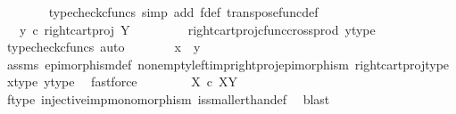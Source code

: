 \begin{isabellebody}
\ \ \ \ \ \ \isamarkupfalse%
\ {\isacharparenleft}{\kern0pt}typecheck{\isacharunderscore}{\kern0pt}cfuncs{\isacharcomma}{\kern0pt}\ simp\ add{\isacharcolon}{\kern0pt}\ f{\isacharunderscore}{\kern0pt}def\ transpose{\isacharunderscore}{\kern0pt}func{\isacharunderscore}{\kern0pt}def{\isacharparenright}{\kern0pt}\isanewline
\ \ \ \ \isamarkupfalse%
\ \isamarkupfalse%
\ {\isachardoublequoteopen}{\isachardot}{\kern0pt}{\isachardot}{\kern0pt}{\isachardot}{\kern0pt}\ {\isacharequal}{\kern0pt}\ y\ {\isasymcirc}\isactrlsub c\ {\isacharparenleft}{\kern0pt}right{\isacharunderscore}{\kern0pt}cart{\isacharunderscore}{\kern0pt}proj\ Y\ {\isasymone}{\isacharparenright}{\kern0pt}{\isachardoublequoteclose}\isanewline
\ \ \ \ \ \ \isamarkupfalse%
\ right{\isacharunderscore}{\kern0pt}cart{\isacharunderscore}{\kern0pt}proj{\isacharunderscore}{\kern0pt}cfunc{\isacharunderscore}{\kern0pt}cross{\isacharunderscore}{\kern0pt}prod\ y{\isacharunderscore}{\kern0pt}type{}\ \isamarkupfalse%
\ {\isacharparenleft}{\kern0pt}typecheck{\isacharunderscore}{\kern0pt}cfuncs{\isacharcomma}{\kern0pt}\ auto{\isacharparenright}{\kern0pt}\isanewline
\ \ \ \ \isamarkupfalse%
\ \isamarkupfalse%
\ {\isachardoublequoteopen}x\ {\isacharequal}{\kern0pt}\ y{\isachardoublequoteclose}\isanewline
\ \ \ \ \ \ \isamarkupfalse%
\ assms\ epimorphism{\isacharunderscore}{\kern0pt}def{}\ nonempty{\isacharunderscore}{\kern0pt}left{\isacharunderscore}{\kern0pt}imp{\isacharunderscore}{\kern0pt}right{\isacharunderscore}{\kern0pt}proj{\isacharunderscore}{\kern0pt}epimorphism\ right{\isacharunderscore}{\kern0pt}cart{\isacharunderscore}{\kern0pt}proj{\isacharunderscore}{\kern0pt}type\ x{\isacharunderscore}{\kern0pt}type{}\ y{\isacharunderscore}{\kern0pt}type{}\ \isamarkupfalse%
\ fastforce\isanewline
\ \ \isamarkupfalse%
\isanewline
\ \ \isamarkupfalse%
\ \isamarkupfalse%
\ {\isachardoublequoteopen}X\ {\isasymle}\isactrlsub c\ X\isactrlbsup Y\isactrlesup {\isachardoublequoteclose}\isanewline
\ \ \ \ \isamarkupfalse%
\ f{\isacharunderscore}{\kern0pt}type\ injective{\isacharunderscore}{\kern0pt}imp{\isacharunderscore}{\kern0pt}monomorphism\ is{\isacharunderscore}{\kern0pt}smaller{\isacharunderscore}{\kern0pt}than{\isacharunderscore}{\kern0pt}def\ \isamarkupfalse%
\ blast\isanewline
{}\isamarkupfalse%
%
\endisatagproof
{\isafoldproof}%

\end{isabellebody}
